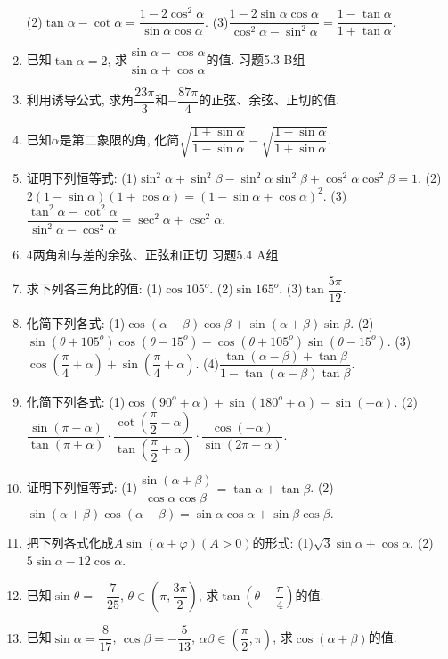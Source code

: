 \documentclass[10pt,a4paper]{article}
\begin{document}
\begin{enumerate}[1.]
(2)$\tan \alpha -\cot \alpha =\dfrac{1-2{{\cos }^2}\alpha }{\sin \alpha \cos \alpha }$.
(3)$\dfrac{1-2\sin \alpha \cos \alpha }{{{\cos }^2}\alpha -{{\sin }^2}\alpha }=\dfrac{1-\tan \alpha }{1+\tan \alpha }$.
\item 已知$\tan \alpha =2$, 求$\dfrac{\sin \alpha -\cos \alpha }{\sin \alpha +\cos \alpha }$的值.
习题5.3  B组
\item 利用诱导公式, 求角$\dfrac{23\pi }3$和$-\dfrac{87\pi }4$的正弦、余弦、正切的值.
\item 已知$\alpha$是第二象限的角, 化简$\sqrt {\dfrac{1+\sin \alpha }{1-\sin \alpha }}-\sqrt {\dfrac{1-\sin \alpha }{1+\sin \alpha }}$.
\item 证明下列恒等式:
(1)$\sin ^2\alpha +\sin ^2\beta -\sin ^2\alpha \sin ^2\beta +\cos ^2\alpha \cos ^2\beta =1$.
(2)$2(1-\sin \alpha)(1+\cos \alpha)=(1-\sin \alpha +\cos \alpha)^2$.
(3)$\dfrac{{{\tan }^2}\alpha -{{\cot }^2}\alpha }{{{\sin }^2}\alpha -{{\cos }^2}\alpha }=\sec ^2\alpha +\csc ^2\alpha$.
\item 4两角和与差的余弦、正弦和正切
习题5.4  A组
\item 求下列各三角比的值:
(1)$\cos 105^o$.								(2)$\sin 165^o$.
(3)$\tan \dfrac{5\pi }{12}$.
\item 化简下列各式:
(1)$\cos (\alpha +\beta)\cos \beta +\sin (\alpha +\beta)\sin \beta$.
(2)$\sin (\theta +105^o)\cos (\theta -15^o)-\cos (\theta +105^o)\sin (\theta -15^o)$.
(3)$\cos (\dfrac{\pi }4+\alpha)+\sin (\dfrac{\pi }4+\alpha)$.
(4)$\dfrac{\tan (\alpha -\beta)+\tan \beta }{1-\tan (\alpha -\beta)\tan \beta }$.
\item 化简下列各式:
(1)$\cos (90^o+\alpha)+\sin (180^o+\alpha)-\sin (-\alpha)$.
(2)$\dfrac{\sin (\pi -\alpha)}{\tan (\pi +\alpha)}\cdot \dfrac{\cot (\dfrac{\pi }2-\alpha)}{\tan (\dfrac{\pi }2+\alpha)}\cdot \dfrac{\cos (-\alpha)}{\sin (2\pi -\alpha)}$.
\item 证明下列恒等式:
(1)$\dfrac{\sin (\alpha +\beta)}{\cos \alpha \cos \beta }=\tan \alpha +\tan \beta$.
(2)$\sin (\alpha +\beta)\cos (\alpha -\beta)=\sin \alpha \cos \alpha +\sin \beta \cos \beta$.
\item 把下列各式化成$A\sin (\alpha +\varphi)(A>0)$的形式:
(1)$\sqrt 3\sin \alpha +\cos \alpha$.					(2)$5\sin \alpha -12\cos \alpha$.
\item 已知$\sin \theta =-\dfrac 7{25}$, $\theta \in (\pi ,\dfrac{3\pi }2)$, 求$\tan (\theta -\dfrac{\pi }4)$的值.
\item 已知$\sin \alpha =\dfrac 8{17}$, $\cos \beta =-\dfrac 5{13}$, $\alpha \beta \in (\dfrac{\pi }2,\pi)$, 求$\cos (\alpha +\beta)$的值.

\end{enumerate}
\end{document}
